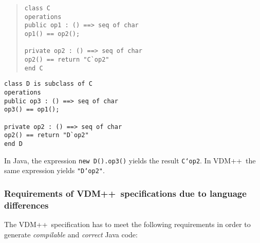\documentclass[\pformat,11pt]{article}
\newcommand{\VDM}{VDM++}
\begin{document}
\begin{minipage}{.55\textwidth}
\begin{quote}
\begin{verbatim}
class C
operations
public op1 : () ==> seq of char
op1() == op2();

private op2 : () ==> seq of char
op2() == return "C`op2"
end C
\end{verbatim}
\end{quote}
\end{minipage}
\begin{minipage}{.45\textwidth}
\begin{verbatim}
class D is subclass of C
operations
public op3 : () ==> seq of char
op3() == op1();

private op2 : () ==> seq of char
op2() == return "D`op2"
end D
\end{verbatim}
\end{minipage}

In Java, the expression \texttt{new D().op3()} yields the result
\texttt{C`op2}. In \VDM\ the same expression yields \texttt{"D`op2"}. 

\subsubsection{Requirements of \VDM\ specifications due to language differences}
\label{lim1}

The \VDM\ specification has to meet the following requirements in
order to generate {\em compilable} and {\em correct} Java code:
\end{document}
